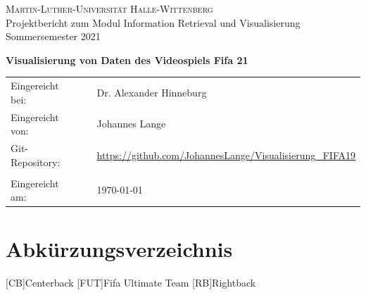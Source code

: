 \documentclass[usegeometry=true]{scrartcl}
\begin{document}

\begin{titlepage}
	\begin{center}
		\large{\textsc{Martin-Luther-Universität Halle-Wittenberg}}\\
				

		Projektbericht zum Modul Information Retrieval und Visualisierung Sommersemester 2021
	\end{center}

	\begin{center}
		\Large
		\textbf{Visualisierung von Daten des Videospiels Fifa 21}
	\end{center}

	\vskip 1cm

	\vskip 0.75cm

	\begin{center}
		\begin{tabular}{lll}
			Eingereicht bei:& & Dr. Alexander Hinneburg\\
			Eingereicht von:  & & Johannes Lange \\
			Git-Repository: & & \url{https://github.com/JohannesLange/Visualisierung_FIFA19}\\
			& & \\
			Eingereicht am: & & \today
		\end{tabular}
	\end{center}

\end{titlepage}




\newpage
\tableofcontents
\newpage

\clearpage
\listoffigures

\section*{Abkürzungsverzeichnis}\label{AV}
	\begin{acronym}
	[CB]{Centerback}
	[FUT]{Fifa Ultimate Team}
	[RB]{Rightback}
	\end{acronym}
\newpage
\end{document}
